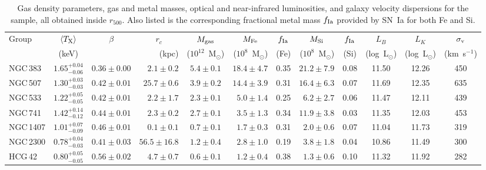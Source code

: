  \begin{table*} 
    \centering 
      \caption{Gas density parameters, gas and metal masses, optical and
        near-infrared luminosities, and galaxy velocity dispersions for
        the sample, all obtained inside $r_{500}$. Also listed is the
        corresponding fractional metal mass $f_{\rm Ia}$ provided by
        SN~Ia for both Fe and Si.}
     \label{tab,gas} 
     \begin{tabular}{@{}lccrcrcrcccc@{}} \hline 
      \multicolumn{1}{l}{Group} &  \multicolumn{1}{c}{$\langle T_{\rm X} \rangle$} &  \multicolumn{1}{c}{$\beta$} &  \multicolumn{1}{c}{$r_c$} & \multicolumn{1}{c}{$M_{\rm gas}$} & \multicolumn{1}{c}{$M_{\rm Fe}$} & \multicolumn{1}{c}{$f_{\rm Ia}$} & \multicolumn{1}{c}{$M_{\rm Si}$} & \multicolumn{1}{c}{$f_{\rm Ia}$} & \multicolumn{1}{c}{$L_B$} & \multicolumn{1}{c}{$L_K$} & \multicolumn{1}{c}{$\sigma_{\rm v}$} \\
     &  (keV) &   & (kpc) \hspace{3mm} & ($10^{12}$~M$_\odot$) & ($10^8$~M$_\odot$) & (Fe) & ($10^8$~M$_\odot$) & (Si) & (log~L$_\odot$) & (log~L$_\odot$) &  (km~s$^{-1}$)  \\ %
   NGC\,383  & $1.65^{+0.04}_{-0.06}$ & $0.36\pm 0.00$ & $2.1\pm 0.2$  & $5.4 \pm 0.1$ & $18.4\pm 4.7$ & 0.35 & $21.2\pm 7.9$ & 0.08 & 11.50 & 12.26 & 450 \\  
   NGC\,507  & $1.30^{+0.03}_{-0.03}$ & $0.42\pm 0.01$ & $25.7\pm 0.6$ & $3.9 \pm 0.2$ & $14.4\pm 3.9$ & 0.31 & $16.4\pm 6.3$ & 0.07 & 11.69 & 12.35 & 635 \\   
   NGC\,533  & $1.22^{+0.05}_{-0.05}$ & $0.42\pm 0.01$ & $2.2\pm 1.7$  & $2.3 \pm 0.1$ & $5.0\pm 1.4$ & 0.25 & $6.2\pm 2.7$   & 0.06 & 11.47 & 12.11 & 439 \\ 
   NGC\,741  & $1.42^{+0.14}_{-0.12}$ & $0.44\pm 0.01$ & $2.3\pm 0.2$ & $2.7 \pm 0.1$ & $3.5\pm 1.3$ & 0.34 & $11.9\pm 3.8$  & 0.03 & 11.35 & 12.03 & 453 \\ 
   NGC\,1407 & $1.01^{+0.07}_{-0.09}$ & $0.46\pm 0.01$ & $0.1\pm 0.1$ & $0.7 \pm 0.1$ & $1.7\pm 0.3$ & 0.31 & $2.0\pm 0.6$   & 0.07 & 11.04 & 11.73 &   319 \\ 
   NGC\,2300 & $0.78^{+0.04}_{-0.03}$ & $0.41\pm 0.03$ & $56.5\pm 16.8$ & $1.2 \pm 0.4$ & $2.8\pm 1.0$ & 0.19  & $3.8\pm 1.8$  & 0.04 & 10.86 & 11.49 &  300 \\ 
   HCG\,42   & $0.80^{+0.05}_{-0.05}$ & $0.56\pm 0.02$ & $4.7\pm 0.7$ & $0.6 \pm 0.1$ &  $1.2\pm 0.4$ & 0.38 & $1.3\pm 0.6$  & 0.10 & 11.32 & 11.92 &   282 \\ 

\end{tabular}
\end{table*}
